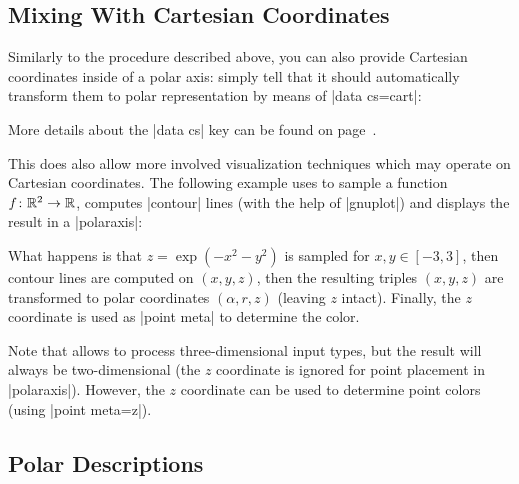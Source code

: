 {\subsection{Mixing With Cartesian Coordinates}
\label{sec:polar:cart}

Similarly to the procedure described above, you can also provide Cartesian
coordinates inside of a polar axis: simply tell \PGFPlots{} that it should
automatically transform them to polar representation by means of
|data cs=cart|:
%
\begin{codeexample}[]
\end{codeexample}
%
\noindent More details about the |data cs| key can be found on
page~\pageref{key:data:cs}.

This does also allow more involved visualization techniques which may operate
on Cartesian coordinates. The following example uses  to
sample a function $f\colon \mathbb{R}^2 \to \mathbb{R}$, computes |contour| lines (with the
help of |gnuplot|) and displays the result in a |polaraxis|:
%
\pgfplotsexpensiveexample
\begin{codeexample}[]
\end{codeexample}
%
\noindent What happens is that $z=\exp(-x^2-y^2)$ is sampled for $x,y \in
[-3,3]$, then contour lines are computed on $(x,y,z)$, then the resulting
triples $(x,y,z)$ are transformed to polar coordinates $(\alpha,r,z)$ (leaving
$z$ intact). Finally, the $z$ coordinate is used as |point meta| to determine
the color.

Note that  allows to process three-dimensional input
types, but the result will always be two-dimensional (the $z$ coordinate is
ignored for point placement in |polaraxis|). However, the $z$ coordinate can be
used to determine point colors (using |point meta=z|).


\subsection{Polar Descriptions}

}
